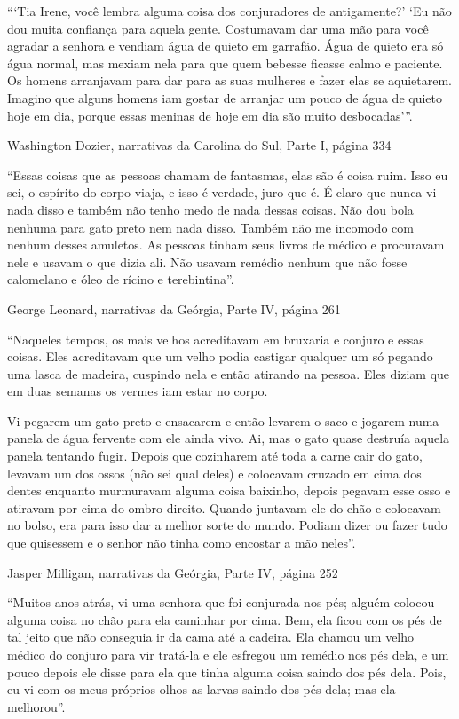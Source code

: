 ```Tia Irene, você lembra alguma coisa dos conjuradores de antigamente?'
`Eu não dou muita confiança para aquela gente. Costumavam dar uma mão
para você agradar a senhora e vendiam água de quieto em garrafão. Água
de quieto era só água normal, mas mexiam nela para que quem bebesse
ficasse calmo e paciente. Os homens arranjavam para dar para as suas
mulheres e fazer elas se aquietarem. Imagino que alguns homens iam
gostar de arranjar um pouco de água de quieto hoje em dia, porque essas
meninas de hoje em dia são muito desbocadas'''.

Washington Dozier, narrativas da Carolina do Sul, Parte I, página 334

``Essas coisas que as pessoas chamam de fantasmas, elas são é coisa
ruim. Isso eu sei, o espírito do corpo viaja, e isso é verdade, juro que
é. É claro que nunca vi nada disso e também não tenho medo de nada
dessas coisas. Não dou bola nenhuma para gato preto nem nada disso.
Também não me incomodo com nenhum desses amuletos. As pessoas tinham
seus livros de médico e procuravam nele e usavam o que dizia ali. Não
usavam remédio nenhum que não fosse calomelano e óleo de rícino e
terebintina''.

George Leonard, narrativas da Geórgia, Parte IV, página 261

``Naqueles tempos, os mais velhos acreditavam em bruxaria e conjuro e
essas coisas. Eles acreditavam que um velho podia castigar qualquer um
só pegando uma lasca de madeira, cuspindo nela e então atirando na
pessoa. Eles diziam que em duas semanas os vermes iam estar no corpo.

Vi pegarem um gato preto e ensacarem e então levarem o saco e jogarem
numa panela de água fervente com ele ainda vivo. Ai, mas o gato quase
destruía aquela panela tentando fugir. Depois que cozinharem até toda a
carne cair do gato, levavam um dos ossos (não sei qual deles) e
colocavam cruzado em cima dos dentes enquanto murmuravam alguma coisa
baixinho, depois pegavam esse osso e atiravam por cima do ombro direito.
Quando juntavam ele do chão e colocavam no bolso, era para isso dar a
melhor sorte do mundo. Podiam dizer ou fazer tudo que quisessem e o
senhor não tinha como encostar a mão neles''.

Jasper Milligan, narrativas da Geórgia, Parte IV, página 252

``Muitos anos atrás, vi uma senhora que foi conjurada nos pés; alguém
colocou alguma coisa no chão para ela caminhar por cima. Bem, ela ficou
com os pés de tal jeito que não conseguia ir da cama até a cadeira. Ela
chamou um velho médico do conjuro para vir tratá-la e ele esfregou um
remédio nos pés dela, e um pouco depois ele disse para ela que tinha
alguma coisa saindo dos pés dela. Pois, eu vi com os meus próprios olhos
as larvas saindo dos pés dela; mas ela melhorou''.

